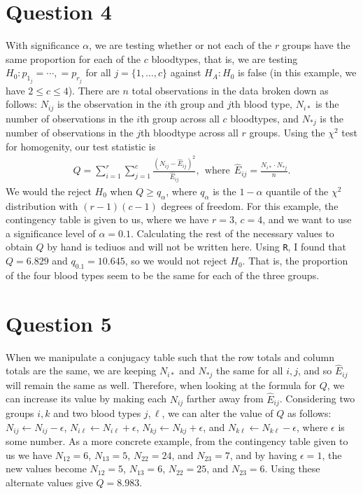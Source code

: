 \documentclass[10pt]{article}
\begin{document}
\section{Question 4} \noindent
With significance \(\alpha\), we are testing whether or not each of the \(r\) groups have the same proportion for each of the \(c\) bloodtypes, that is, we 
are testing \(H_0: p_{1_j} = \cdots, = p_{r_j}\) for all \(j = \{1, \ldots, c\}\) against \(H_A : H_0\) is false (in this example, we have \(2 \le c \le 4\)). 
There are \(n\) total observations in the data broken down as follows: \(N_{ij}\) is the observation in the \(i\)th group and \(j\)th blood type, 
\(N_{i*}\) is the number of observations in the \(i\)th group across all \(c\) bloodtypes, and \(N_{*j}\) is the number of observations in the 
\(j\)th bloodtype across all \(r\) groups. 
Using the \(\chi^2\) test for homogenity, our test statistic is 
\begin{align*}
    Q
    = \sum_{i=1}^r \sum_{j=1}^c \frac{(N_{ij} - \hat{E}_{ij})^2}{\hat{E}_{ij}},
    ~~\text{where}~~
    \hat{E}_{ij} = \frac{N_{i*} \cdot N_{*j}}{n}.
\end{align*}
We would the reject \(H_0\) when \(Q \ge q_{\alpha}\), where \(q_{\alpha}\) is the \(1 - \alpha\) quantile of the \(\chi^2\) distribution with 
\((r - 1)(c - 1)\) degrees of freedom. For this example, the contingency table is given to us, where we have \(r = 3\), \(c = 4\), and we want 
to use a significance level of \(\alpha = 0.1\).
Calculating the rest of the necessary values to obtain \(Q\) by hand is tediuos and will not be written here. 
Using \texttt{R}, I found that \(Q = 6.829\) and \(q_{0.1} = 10.645\), so we would not reject \(H_0\). That is, the proportion of the four blood types 
seem to be the same for each of the three groups. 

\section{Question 5} \noindent
When we manipulate a conjugacy table such that the row totals and column totals are the same, we are keeping \(N_{i*}\) and \(N_{*j}\) the same for all 
\(i,j\), and so \(\hat{E}_{ij}\) will remain the same as well. Therefore, when looking at the formula for \(Q\), we can increase its value by making each 
\(N_{ij}\) farther away from \(\hat{E}_{ij}\). Considering two groups \(i,k\) and two blood types \(j,\ell\), we can alter the value of \(Q\) as follows:
\(N_{ij} \leftarrow N_{ij} - \epsilon\), \(N_{i\ell} \leftarrow N_{i\ell} + \epsilon\), \(N_{kj} \leftarrow N_{kj} + \epsilon\), and 
\(N_{k\ell} \leftarrow N_{k\ell} - \epsilon\), where \(\epsilon\) is some number. As a more concrete example, from the contingency table given to us we have 
\(N_{12} = 6\), \(N_{13} = 5\), \(N_{22} = 24\), and \(N_{23} = 7\), and by having \(\epsilon = 1\), the new values become
\(N_{12} = 5\), \(N_{13} = 6\), \(N_{22} = 25\), and \(N_{23} = 6\). Using these alternate values give \(Q = 8.983\). 
\end{document}

